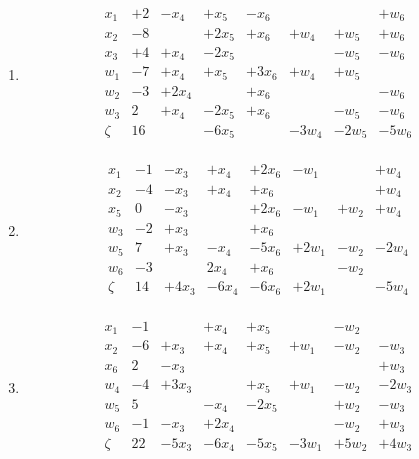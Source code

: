 \documentclass[11pt]{article}
\begin{document}
\begin{enumerate}
\item 
  \[\begin{array}{r|ccccccccccccc}
  x_1 & +2 &  -x_4 & +x_5 & -x_6 & & & +w_{6}\\
  x_2 & -8 &  & +2x_5 & +x_6 & +w_{4} & +w_{5} & +w_{6} \\
  x_3 & +4 &  +x_4 & -2x_5 & & & -w_5 & -w_6 \\
  w_1 & -7 &  +x_4 & +x_5 & +3x_6 & +w_4 & +w_5 & & \\
  w_2 & -3 &  +2x_4 & & +x_6 & & & -w_6 \\
  w_3 & 2 &  +x_4 & -2x_5 & +x_6 & & -w_5 & -w_6 \\ 
  \hline
  \zeta & 16 & & -6x_5 & & -3w_4 & -2w_5 & -5w_6 \\
  \end{array}\]
\item 
  \[\begin{array}{r|ccccccccccccc}
  x_1 & -1 & -x_3 & +x_4 & +2x_6 & -w_1 & & +w_4 \\ 
  x_2 & -4 & -x_3 & +x_4 & +x_6 & & & +w_4 \\
  x_5 & 0 & -x_3 & & +2x_6 & -w_1 & +w_2 & +w_4 \\
  w_3 & -2 & +x_3 & & +x_6 & & & & \\
  w_5 & 7 & +x_3 & -x_4 & -5x_6 & +2w_1 & -w_2 & -2w_4 \\
  w_6 & -3 & & 2x_4 & +x_6 & & -w_2 & & \\
  \hline
  \zeta & 14 & +4x_3 & -6x_4 & -6x_6 & +2w_1 & & -5w_4 \\
  \end{array}\]
\item 
  \[\begin{array}{r|ccccccccccccc}
  x_1 & -1 & & +x_4 & +x_5 & & -w_2 & & \\
  x_2 & -6 & +x_3 & +x_4 & +x_5 & +w_1 & -w_2 & -w_3 \\
  x_6 & 2 & -x_3 & & & & & +w_3 \\
  w_4 & -4 & +3x_3 & & +x_5 & +w_1 & -w_2 & -2w_3 \\
  w_5 & 5 & & -x_4 & -2x_5 & & +w_2 & -w_3 \\
  w_6 & -1 & -x_3 & +2x_4 & & & -w_2 & +w_3 \\
  \hline
  \zeta & 22 & -5x_3 & -6x_4 & -5x_5 & -3w_1 & +5w_2 & +4w_3 \\
  \end{array}\]
\end{enumerate}
\end{document}

